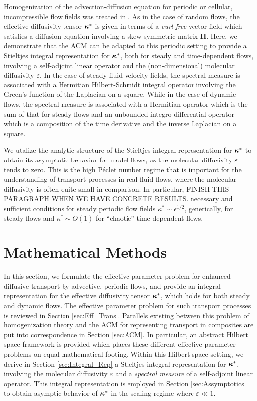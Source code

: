 \documentclass[11pt]{amsart}
\newcommand{\Hb}{\mathbf{H}}
\newcommand\bkappa{\mbox{\boldmath${\kappa}$}}
\begin{document}
Homogenization of the advection-diffusion equation for periodic or
cellular, incompressible flow fields was treated in
\cite{Fannjiang:SIAM_JAM:333,Fannjiang:1997:1033}. As in the case of
random flows, the effective diffusivity tensor
$\bkappa^*$ is given in terms of a \emph{curl-free} vector field which
satisfies a diffusion equation involving a skew-symmetric
matrix $\Hb$. Here, we demonstrate that the ACM can
be adapted to this periodic setting to provide a Stieltjes
integral representation for $\bkappa^*$, both for steady and
time-dependent flows, involving a self-adjoint linear operator and the 
(non-dimensional) molecular diffusivity $\varepsilon$. In the case of steady
fluid velocity fields, the spectral measure is associated with a
Hermitian Hilbert-Schmidt integral operator involving the Green's
function of the Laplacian on a square. While in the case of dynamic
flows, the spectral measure is associated with a Hermitian operator
which is the sum of that for steady flows and an unbounded
integro-differential operator which is a composition of the time
derivative and the inverse Laplacian on a square.     
 

We utalize the analytic structure of the Stieltjes integral
representation for $\bkappa^*$ to obtain its asymptotic behavior for
model flows, as the molecular diffusivity $\varepsilon$ tends to zero. This is
the high P\'{e}clet number regime that is important for the
understanding of transport processes in real fluid flows, where the
molecular diffusivity is often quite small in comparison. In
particular, FINISH THIS PARAGRAPH WHEN WE HAVE CONCRETE RESULTS.
necessary and sufficient conditions for steady periodic flow
fields $\kappa^*\sim\epsilon^{1/2}$, generically, for steady flows and $\kappa^*\sim O(1)$ for
``chaotic'' time-dependent flows. 

%
\section{Mathematical Methods}\label{sec:Mathematical_Methods} 
%
In this section, we formulate the effective parameter problem for
enhanced diffusive transport by advective, periodic flows, and provide
an integral representation for the effective diffusivity tensor
$\bkappa^*$, which holds for both steady and dynamic flows. The
effective parameter problem 
\cite{Fannjiang:SIAM_JAM:333} for such transport processes  is
reviewed in Section \ref{sec:Eff_Trans}. Parallels existing between this
problem of homogenization theory \cite{Bensoussan:Book:1978} and the
ACM for representing transport in composites are put into
correspondence in Section \ref{sec:ACM}. In particular, an abstract
Hilbert space framework is provided which places these different
effective parameter problems on equal mathematical footing. Within
this Hilbert space setting, we derive in Section
\ref{sec:Integral_Rep} a Stieltjes integral representation for
$\bkappa^*$, involving the molecular diffusivity $\varepsilon$ and a
\emph{spectral measure} of a self-adjoint linear operator. This
integral representation is employed in Section \ref{sec:Assymptotics}
to obtain asymptic behavior of $\bkappa^*$ in the scaling regime where
$\varepsilon\ll1$. 
\end{document}
